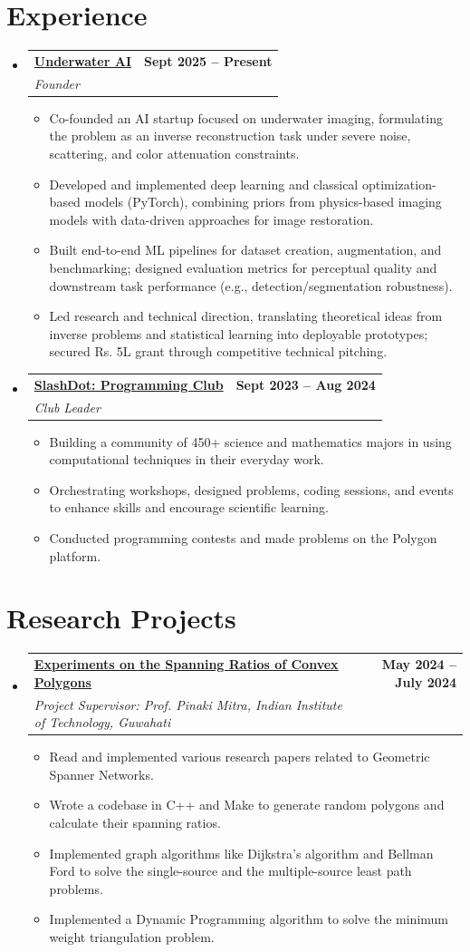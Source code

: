 \documentclass[letterpaper,11pt]{article}
\makeatletter
\newcommand{\resumeItem}[1]{
  \item\small{
    {#1 \vspace{-2pt}}
  }
}
\newcommand{\resumeSubheading}[4]{
  \vspace{-2pt}\item
    \begin{tabular*}{1.0\textwidth}[t]{l@{\extracolsep{\fill}}r}
      \textbf{#1} & \textbf{\small #2} \\
      \textit{\small#3} & \textit{\small #4} \\
    \end{tabular*}\vspace{-7pt}
}
\newcommand{\resumeSubHeadingListStart}{\begin{itemize}[leftmargin=0.0in, label={}]}
\newcommand{\resumeSubHeadingListEnd}{\end{itemize}}
\newcommand{\resumeItemListStart}{\begin{itemize}}
\newcommand{\resumeItemListEnd}{\end{itemize}\vspace{-5pt}}
\makeatother
\begin{document}
\section{Experience}
\resumeSubHeadingListStart
\resumeSubheading{\underline{Underwater AI}}{Sept 2025 -- Present}{Founder}{}
\resumeItemListStart
\resumeItem{Co-founded an AI startup focused on underwater imaging, formulating the problem as an inverse reconstruction task under severe noise, scattering, and color attenuation constraints.}
\resumeItem{Developed and implemented deep learning and classical optimization-based models (PyTorch), combining priors from physics-based imaging models with data-driven approaches for image restoration.}
\resumeItem{Built end-to-end ML pipelines for dataset creation, augmentation, and benchmarking; designed evaluation metrics for perceptual quality and downstream task performance (e.g., detection/segmentation robustness).}
\resumeItem{Led research and technical direction, translating theoretical ideas from inverse problems and statistical learning into deployable prototypes; secured Rs. 5L grant through competitive technical pitching.}
\resumeItemListEnd
\resumeSubHeadingListEnd

\resumeSubHeadingListStart
\resumeSubheading{\underline{SlashDot: Programming Club}}{Sept 2023 -- Aug 2024}{Club Leader}{}
\resumeItemListStart
\resumeItem{Building a community of 450+ science and mathematics majors in using computational techniques in their everyday work.}
\resumeItem{Orchestrating workshops, designed problems, coding sessions, and events to enhance skills and encourage scientific learning.}
\resumeItem{Conducted programming contests and made problems on the Polygon platform.}
\resumeItemListEnd
\resumeSubHeadingListEnd

\section{Research Projects}
\resumeSubHeadingListStart
\resumeSubheading{\href{https://github.com/GautamSingh6599/spanning-factor}{\underline{Experiments on the Spanning Ratios of Convex Polygons}}}{May 2024 -- July 2024}{Project Supervisor: Prof. Pinaki Mitra, Indian Institute of Technology, Guwahati}{}
\resumeItemListStart
\resumeItem{Read and implemented various research papers related to Geometric Spanner Networks.}
\resumeItem{Wrote a codebase in C++ and Make to generate random polygons and calculate their spanning ratios.}
\resumeItem{Implemented graph algorithms like Dijkstra's algorithm and Bellman Ford to solve the single-source and the multiple-source least path problems.}
\resumeItem{Implemented a Dynamic Programming algorithm to solve the minimum weight triangulation problem.}
\resumeItemListEnd
\resumeSubHeadingListEnd
\end{document}
